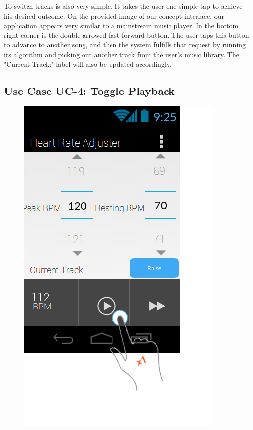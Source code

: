 \documentclass[letterpaper,english, 12pt]{scrreprt}
\begin{document}
To switch tracks is also very simple. It takes the user one simple tap to achieve his desired outcome. On the provided image of our concept interface, our application appears very similar to a mainstream music player. In the bottom right corner is the double-arrowed fast forward button. The user taps this button to advance to another song, and then the system fulfills that request by running its algorithm and picking out another track from the user's music library. The "Current Track:" label will also be updated accordingly.

\subsection{Use Case UC-4: Toggle Playback}

\begin{figure}[H]
	\centering
	\includegraphics{img/Prelim_Design/PrelimDesign_3.png}\\
\end{figure}
\end{document}

